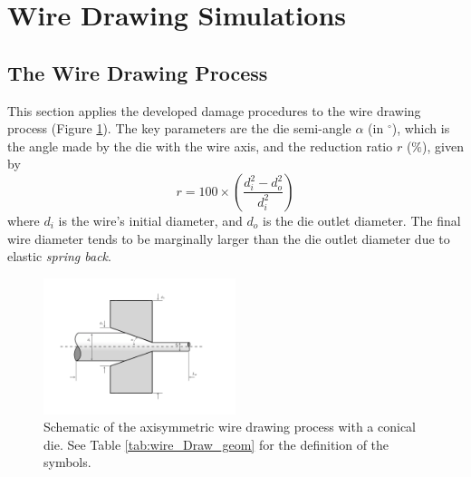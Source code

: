 \documentclass[sn-mathphys,Numbered]{sn-jnl}%
\begin{document}
\section{Wire Drawing Simulations} \label{sec:wire_drawing}

\subsection{The Wire Drawing Process}

This section applies the developed damage procedures to the wire drawing process (Figure \ref{fig:wireDrawing}).
The key parameters are the die semi-angle $\alpha$ (in $^{\circ}$), which is the angle made by the die with the wire axis, and the reduction ratio $r$ ($\%$), given by
\begin{equation}
    r = 100 \times \left(\frac{d_i^2 - d_o^2}{d_i^2}\right)
\end{equation}
where $d_i$ is the wire's initial diameter, and $d_o$ is the die outlet diameter.
The final wire diameter tends to be marginally larger than the die outlet diameter due to elastic \emph{spring back}.
\begin{figure}[htb]
\begin{center}
	\includegraphics[width=0.5\textwidth]{./Figures/SimulationAndAnalysis/modelCompare/drawingSchematic.pdf}
	\caption{Schematic of the axisymmetric wire drawing process with a conical die. See Table \ref{tab:wire_Draw_geom} for the definition of the symbols.}
	\label{fig:wireDrawing}
\end{center}
\end{figure}

\end{document}
